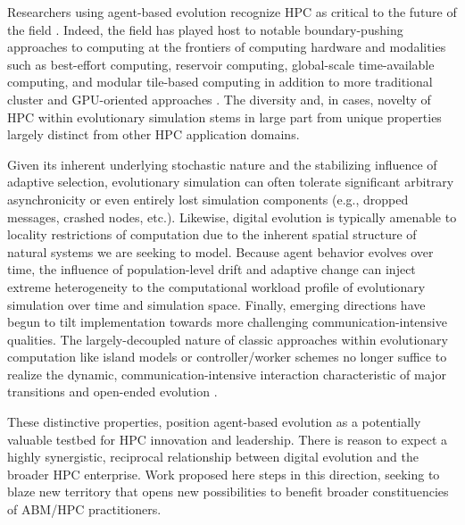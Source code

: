 Researchers using agent-based evolution recognize HPC as critical to the future of the field \citep{ackley2016indefinite}.
Indeed, the field has played host to notable boundary-pushing approaches to computing at the frontiers of computing hardware and modalities such as best-effort computing, reservoir computing, global-scale time-available computing, and modular tile-based computing in addition to more traditional cluster and GPU-oriented approaches \citep{moreno2021conduit,ackley2020best,ackley2023robust,heinemann2008artificial,miikkulainen2024evolving}.
The diversity and, in cases, novelty of HPC within evolutionary simulation stems in large part from unique properties largely distinct from other HPC application domains.

Given its inherent underlying stochastic nature and the stabilizing influence of adaptive selection, evolutionary simulation can often tolerate significant arbitrary asynchronicity or even entirely lost simulation components (e.g., dropped messages, crashed nodes, etc.).
Likewise, digital evolution is typically amenable to locality restrictions of computation due to the inherent spatial structure of natural systems we are seeking to model.
Because agent behavior evolves over time, the influence of population-level drift and adaptive change can inject extreme heterogeneity to the computational workload profile of evolutionary simulation over time and simulation space.
Finally, emerging directions have begun to tilt implementation towards more challenging communication-intensive qualities.
The largely-decoupled nature of classic approaches within evolutionary computation like island models or controller/worker schemes  \citep{bennett1999building,cantu2001master} no longer suffice to realize the dynamic, communication-intensive interaction characteristic of major transitions and open-ended evolution \citep{moreno2022engineering}.

These distinctive properties, position agent-based evolution as a potentially valuable testbed for HPC innovation and leadership.
There is reason to expect a highly synergistic, reciprocal relationship between digital evolution and the broader HPC enterprise.
Work proposed here steps in this direction, seeking to blaze new territory that opens new possibilities to benefit broader constituencies of ABM/HPC practitioners.

